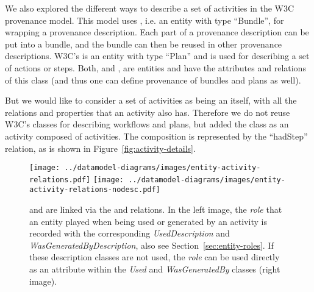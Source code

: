 We also explored the different ways to describe a set of activities in the W3C 
provenance model. This model uses , i.e. an entity with type ``Bundle'', 
for wrapping a provenance description. Each part of a provenance description can be 
put into a bundle, and the bundle can then be reused in other provenance descriptions. 
W3C's  is an entity with type ``Plan'' and is used for describing a 
set of actions or steps. Both,  and , are entities and 
have the attributes and relations of this class (and thus one can define provenance of bundles and plans as well).

But we would like to consider a set of activities as being an  itself, 
with all the relations and properties that an activity also has. Therefore we do not reuse
W3C's classes for describing workflows and plans, but added 
the class  as an activity composed of activities. The composition is represented by 
the ``hadStep'' relation, as is shown in Figure~\ref{fig:activity-details}.

%




\begin{figure}[h]
\centering
\texttt{[image: ../datamodel-diagrams/images/entity-activity-relations.pdf]}
\hspace{0.15\textwidth}
\texttt{[image: ../datamodel-diagrams/images/entity-activity-relations-nodesc.pdf]}
\caption[- relations]{ and  are linked via the  and  relations. In the left image, the \emph{role} that an entity played when being used or generated by an activity is recorded with the corresponding \emph{UsedDescription} and \emph{WasGeneratedByDescription}, also see Section~\ref{sec:entity-roles}. If these description classes are not used, the \emph{role} can be used directly as an attribute within the \emph{Used} and \emph{WasGeneratedBy} classes (right image).}
\label{fig:entity-activity-relations}
\end{figure}


